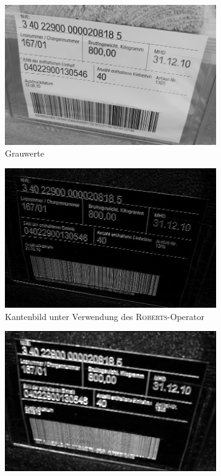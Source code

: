 \begin{figure}[H]
  \centering
  \begin{subfigure}[t]{0.32\columnwidth}
    \centering
    \includegraphics[width=\columnwidth]{img/techniques/candidate-extraction/grayscale}
    \caption{\scriptsize Grauwerte}
  \end{subfigure}
  \begin{subfigure}[t]{0.32\columnwidth}
    \centering
    \includegraphics[width=\columnwidth]{img/techniques/candidate-extraction/edges}
    \caption{\scriptsize Kantenbild unter Verwendung des \textsc{Roberts}-Operator}
  \end{subfigure}
  \begin{subfigure}[t]{0.32\columnwidth}
    \centering
    \includegraphics[width=\columnwidth]{img/techniques/candidate-extraction/dilation}

\end{subfigure}
\end{figure}
